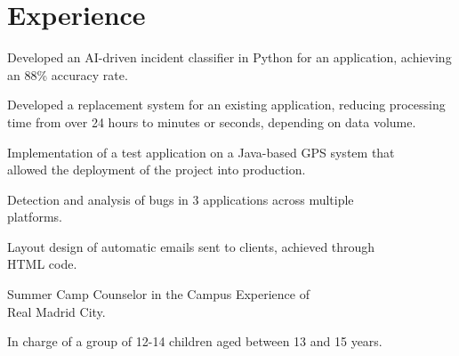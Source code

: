 \documentclass[]{single-page-resume}
\begin{document}
\hspace{1cm}
\begin{minipage}[t]{0.66\textwidth} 


\section{Experience}
\vspace{\topsep} %
\begin{tightemize}
    \item Developed an AI-driven incident classifier in Python for an application, achieving an 88\% accuracy rate.
    \item Developed a replacement system for an existing application, reducing processing time from over 24 hours to minutes or seconds, depending on data volume.
\end{tightemize}
\sectionsep
{}
\vspace{\topsep} %
\begin{tightemize}
    \item Implementation of a test application on a Java-based GPS system that \\allowed the deployment of the project into production. 
    \item Detection and analysis of bugs in 3 applications across multiple \\platforms.
    \item Layout design of automatic emails sent to clients, achieved through \\HTML code.
\end{tightemize}
\sectionsep 
{}
\begin{tightemize}
    \item Summer Camp Counselor in the Campus Experience of \\Real Madrid City.
    \item In charge of a group of 12-14 children aged between 13 and 15 years.
\end{tightemize}
\sectionsep 


\end{minipage}
\end{document}
